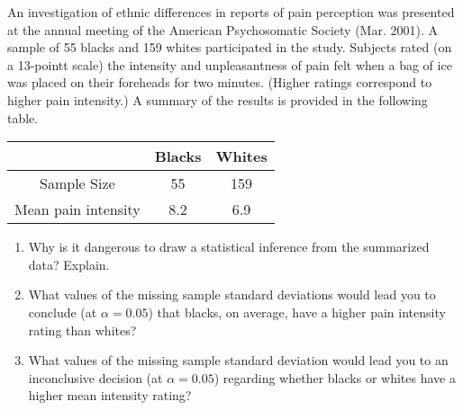 
\begin{exercise}

An investigation of ethnic differences in reports of pain perception
was presented at the annual meeting of the American Psychosomatic Society
(Mar. 2001). A sample of 55 blacks and 159 whites participated in the study.
Subjects rated (on a 13-pointt scale) the intensity and unpleasantness of
pain felt when a bag of ice was placed on their foreheads for two minutes.
(Higher ratings correspond to higher pain intensity.)
A summary of the results is provided in the following table.

\begin{center}
    \begin{tabular}{c|cc}
        & Blacks & Whites \\
        \hline
        Sample Size & 55 & 159 \\
        Mean pain intensity & 8.2 & 6.9
    \end{tabular}
\end{center}

\begin{enumerate}[label = (\alph*)]
    \item Why is it dangerous to draw a statistical inference from the summarized data? Explain.
    \item What values of the missing sample standard deviations would lead
    you to conclude (at $\alpha = 0.05$) that blacks, on average, have
    a higher pain intensity rating than whites?
    \item What values of the missing sample standard deviation would lead
    you to an inconclusive decision (at $\alpha = 0.05$) regarding whether
    blacks or whites have a higher mean intensity rating?
\end{enumerate}

\end{exercise}


\begin{solution}

\phantom{}

\end{solution}

